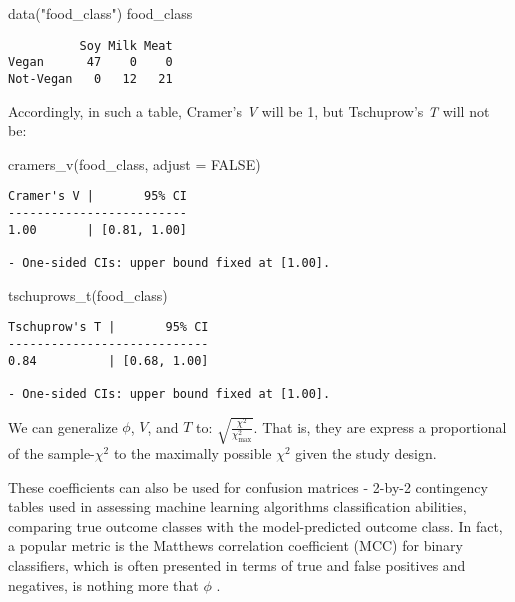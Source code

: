 \documentclass[mathematics,article,submit,moreauthors,pdftex]{mdpi}
\newenvironment{Shaded}{\begin{snugshade}}{\end{snugshade}}
\newcommand{\AttributeTok}[1]{\textcolor[rgb]{0.77,0.63,0.00}{#1}}
\newcommand{\ConstantTok}[1]{\textcolor[rgb]{0.00,0.00,0.00}{#1}}
\newcommand{\FunctionTok}[1]{\textcolor[rgb]{0.00,0.00,0.00}{#1}}
\newcommand{\NormalTok}[1]{#1}
\newcommand{\StringTok}[1]{\textcolor[rgb]{0.31,0.60,0.02}{#1}}
\begin{document}
\begin{Shaded}
\begin{Highlighting}[]
\FunctionTok{data}\NormalTok{(}\StringTok{"food\_class"}\NormalTok{)}
\NormalTok{food\_class}
\end{Highlighting}
\end{Shaded}

\begin{verbatim}
          Soy Milk Meat
Vegan      47    0    0
Not-Vegan   0   12   21
\end{verbatim}

Accordingly, in such a table, Cramer's \emph{V} will be 1, but
Tschuprow's \emph{T} will not be:

\begin{Shaded}
\begin{Highlighting}[]
\FunctionTok{cramers\_v}\NormalTok{(food\_class, }\AttributeTok{adjust =} \ConstantTok{FALSE}\NormalTok{)}
\end{Highlighting}
\end{Shaded}

\begin{verbatim}
Cramer's V |       95% CI
-------------------------
1.00       | [0.81, 1.00]

- One-sided CIs: upper bound fixed at [1.00].
\end{verbatim}

\begin{Shaded}
\begin{Highlighting}[]
\FunctionTok{tschuprows\_t}\NormalTok{(food\_class)}
\end{Highlighting}
\end{Shaded}

\begin{verbatim}
Tschuprow's T |       95% CI
----------------------------
0.84          | [0.68, 1.00]

- One-sided CIs: upper bound fixed at [1.00].
\end{verbatim}

We can generalize \(\phi\), \(V\), and \(T\) to:
\(\sqrt{\frac{\chi^2}{\chi^2_{\text{max}}}}\). That is, they are express
a proportional of the sample-\(\chi^2\) to the maximally possible
\(\chi^2\) given the study design.

These coefficients can also be used for confusion matrices - 2-by-2
contingency tables used in assessing machine learning algorithms
classification abilities, comparing true outcome classes with the
model-predicted outcome class. In fact, a popular metric is the Matthews
correlation coefficient (MCC) for binary classifiers, which is often
presented in terms of true and false positives and negatives, is nothing
more that \(\phi\) \citep{chicco2020advantages}.
\end{document}
